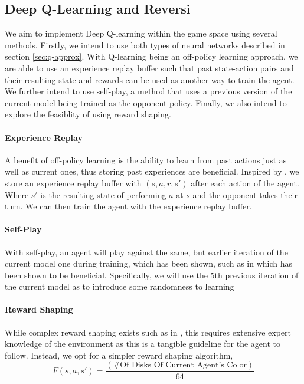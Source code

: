 \documentclass[../report.tex]{subfiles}
\begin{document}
\subsection{Deep Q-Learning and Reversi}
We aim to implement Deep Q-learning within the game space using several methods. Firstly, we intend to use both types of neural networks described in section \ref{sec:q-approx}. With Q-learning being an off-policy learning approach, we are able to use an experience replay buffer such that past state-action pairs and their resulting state and rewards can be used as another way to train the agent. We further intend to use self-play, a method that uses a previous version of the current model being trained as the opponent policy. Finally, we also intend to explore the feasiblity of using reward shaping.

\paragraph{Experience Replay}
A benefit of off-policy learning is the ability to learn from past actions just as well as current ones, thus storing past experiences are beneficial. Inspired by \citet{mnih2013playing}, we store an experience replay buffer with $(s,a,r,s')$ after each action of the agent. Where $s'$ is the resulting state of performing $a$ at $s$ and the opponent takes their turn. We can then train the agent with the experience replay buffer.

\paragraph{Self-Play}
With self-play, an agent will play against the same, but earlier iteration of the current model one during training, which has been shown, such as in \citet{ree13} which has been shown to be beneficial. Specifically, we will use the 5th previous iteration of the current model as to introduce some randomness to learning

\paragraph{Reward Shaping}
While complex reward shaping exists such as in \cite{ng1999policy}, this requires extensive expert knowledge of the environment as this is a tangible guideline for the agent to follow. Instead, we opt for a simpler reward shaping algorithm,
\begin{equation}\label{eq:simple-reward-shaping}
    F(s,a,s') = \frac{(\text{\# Of Disks Of Current Agent's Color})}{64}
\end{equation}
\end{document}
